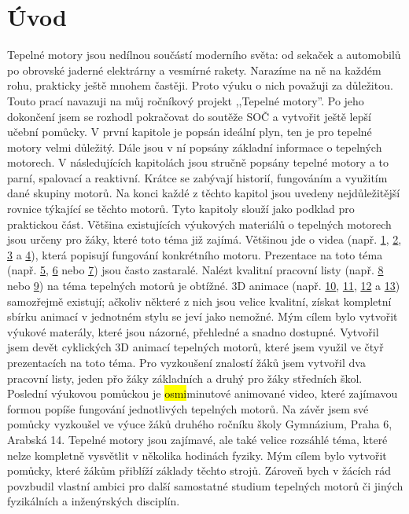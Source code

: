 \section{Úvod}
{Tepelné motory jsou nedílnou součástí moderního světa: od sekaček a automobilů po obrovské jaderné elektrárny a vesmírné rakety. Narazíme na ně na každém rohu, prakticky ještě mnohem častěji. Proto výuku o nich považuji za důležitou. Touto prací navazuji na můj ročníkový projekt ,,Tepelné motory”. Po jeho dokončení jsem se rozhodl pokračovat do soutěže SOČ a vytvořit ještě lepší učební pomůcky.}\odst
{V první kapitole je popsán ideální plyn, ten je pro tepelné motory velmi důležitý. Dále jsou v ní popsány základní informace o tepelných motorech. V následujících kapitolách jsou stručně popsány tepelné motory a to parní, spalovací a reaktivní. Krátce se zabývají historií, fungováním a využitím dané skupiny motorů. Na konci každé z těchto kapitol jsou uvedeny nejdůležitější rovnice týkající se těchto motorů. Tyto kapitoly slouží jako podklad pro praktickou část.}\odst
{Většina existujících výukových materiálů o tepelných motorech jsou určeny pro žáky, které toto téma již zajímá. Většinou jde o videa (např. \href{https://www.youtube.com/watch?v=k9DhdvbmRiw}{1}, \href{https://www.youtube.com/watch?v=dR1pyp3q9Ko}{2}, \href{https://www.youtube.com/watch?v=eP8nWqcWmAc}{3} a \href{https://www.youtube.com/watch?v=Fpbg1jUh36M}{4}), která popisují fungování konkrétního motoru. Prezentace na toto téma (např. \href{https://zs-nucice.cz/UserFiles/File/eu_new_361-400/VY_32_INOVACE_374.pdf}{5}, \href{https://view.officeapps.live.com/op/view.aspx?src=http://dumy.cz/nahled/73077}{6} nebo \href{https://slideplayer.cz/slide/12677857/}{7}) jsou často zastaralé. Nalézt kvalitní pracovní listy (např. \href{https://view.officeapps.live.com/op/view.aspx?src=http://dumy.cz/nahled/117673}{8} nebo \href{https://www.soshlinky.cz/documents/uploads/71\%20Motory.xlsx}{9}) na téma tepelných motorů je obtížné. 3D animace (např. \href{https://www.youtube.com/watch?v=kWRRHRWuduk}{10}, \href{https://www.youtube.com/watch?v=ZQvfHyfgBtA&t=26s}{11}, \href{https://www.youtube.com/watch?v=MUxP3PCDRTE}{12} a \href{https://www.youtube.com/watch?v=Iiu3UyxLEHk}{13}) samozřejmě existují; ačkoliv některé z nich jsou velice kvalitní, získat kompletní sbírku animací v jednotném stylu se jeví jako nemožné.}\odst
{Mým cílem bylo vytvořit výukové materály, které jsou názorné, přehledné a snadno dostupné. Vytvořil jsem devět cyklických 3D animací tepelných motorů, které jsem využil ve čtyř prezentacích na toto téma. Pro vyzkoušení znalostí žáků jsem vytvořil dva pracovní listy, jeden přo žáky základních a druhý pro žáky středních škol. Poslední výukovou pomůckou je \hl{osmi}minutové animované video, které zajímavou formou popíše fungování jednotlivých tepelných motorů. Na závěr jsem své pomůcky vyzkoušel ve výuce žáků druhého ročníku školy Gymnázium, Praha 6, Arabská 14.}\odst
{Tepelné motory jsou zajímavé, ale také velice rozsáhlé téma, které nelze kompletně vysvětlit v několika hodinách fyziky. Mým cílem bylo vytvořit pomůcky, které žákům přiblíží základy těchto strojů. Zároveň bych v žácích rád povzbudil vlastní ambici pro další samostatné studium tepelných motorů či jiných fyzikálních a inženýrských disciplín.}